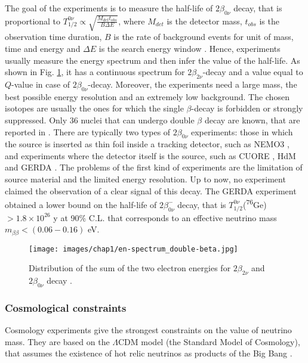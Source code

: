 The goal of the experiments is to measure the half-life of $2\beta_{0\nu}$ decay, that is proportional to $T^{0\nu}_{1/2} \propto \sqrt{\frac{M_{det} t_{obs}}{B\Delta E}}$, where $M_{det}$ is the detector mass, $t_{obs}$ is the observation time duration, $B$ is the rate of background events for unit of mass, time and energy and $\Delta E$ is the search energy window \cite{exp-formula-neutrinoless}. Hence, experiments usually measure the energy spectrum and then infer the value of the half-life. As shown in Fig. \ref{fig:energy-spect}, it has a continuous spectrum for $2\beta_{2\nu}$-decay and a value equal to $Q$-value in case of $2\beta_{0\nu}$-decay. Moreover, the experiments need a large mass, the best possible energy resolution and an extremely low background. The chosen isotopes are usually the ones for which the single $\beta$-decay is forbidden or strongly suppressed. Only 36 nuclei that can undergo double $\beta$ decay are known, that are reported in \cite{list-of-double-decay}.
There are typically two types of $2\beta_{0\nu}$ experiments: those in which the source is inserted as thin foil inside a tracking detector, such as NEMO3 \cite{NEMO3}, and experiments where the detector itself is the source, such as CUORE \cite{CUORE}, HdM \cite{HdM-2} and GERDA \cite{Gerda-2}. The problems of the first kind of experiments are the limitation of source material and the limited energy resolution.
Up to now, no experiment claimed the observation of a clear signal of this decay. The GERDA experiment obtained a lower bound on the half-life of $2\beta^-_{0\nu}$ decay, that is $T^{0\nu}_{1/2}$(\textsuperscript{76}Ge)$> 1.8 \times 10^{26}$ y at 90\% C.L. that corresponds to an effective neutrino mass $m_{\beta\beta} < (0.06 - 0.16)$ eV. \cite{GERDA}

\begin{figure}
    \centering
    \texttt{[image: images/chap1/en-spectrum\_double-beta.jpg]}
    \caption{Distribution of the sum of the two electron energies for $2\beta_{2\nu}$ and $2\beta_{0\nu}$ decay \cite{en-spectrum-double-beta}.}
    \label{fig:energy-spect}
\end{figure}

\subsubsection{Cosmological constraints}
Cosmology experiments give the strongest constraints on the value of neutrino mass. They are based on the $\Lambda$CDM model (the Standard Model of Cosmology), that assumes the existence of hot relic neutrinos as products of the Big Bang \cite{giunti_kim_fundamental}. 

